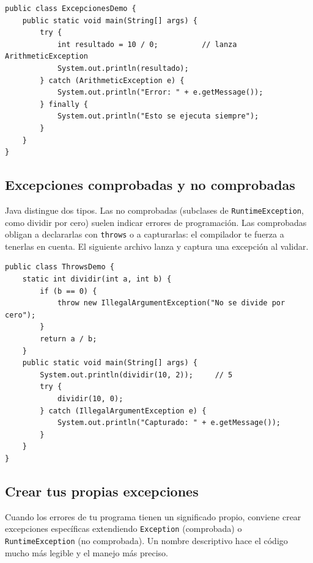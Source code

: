 \documentclass[11pt]{article}
\begin{document}
\begin{cajacodigo}
\begin{lstlisting}[style=java]
public class ExcepcionesDemo {
    public static void main(String[] args) {
        try {
            int resultado = 10 / 0;          // lanza ArithmeticException
            System.out.println(resultado);
        } catch (ArithmeticException e) {
            System.out.println("Error: " + e.getMessage());
        } finally {
            System.out.println("Esto se ejecuta siempre");
        }
    }
}
\end{lstlisting}
\end{cajacodigo}
\vspace{2pt}
\subsection{Excepciones comprobadas y no comprobadas}
Java distingue dos tipos. Las no comprobadas (subclases de \texttt{Runtime\allowbreak{}Exception}, como dividir por cero) suelen indicar errores de programación. Las comprobadas obligan a declararlas con \texttt{throws} o a capturarlas: el compilador te fuerza a tenerlas en cuenta. El siguiente archivo lanza y captura una excepción al validar.

\begin{cajacodigo}
\begin{lstlisting}[style=java]
public class ThrowsDemo {
    static int dividir(int a, int b) {
        if (b == 0) {
            throw new IllegalArgumentException("No se divide por cero");
        }
        return a / b;
    }
    public static void main(String[] args) {
        System.out.println(dividir(10, 2));     // 5
        try {
            dividir(10, 0);
        } catch (IllegalArgumentException e) {
            System.out.println("Capturado: " + e.getMessage());
        }
    }
}
\end{lstlisting}
\end{cajacodigo}
\vspace{2pt}
\subsection{Crear tus propias excepciones}
Cuando los errores de tu programa tienen un significado propio, conviene crear excepciones específicas extendiendo \texttt{Exception} (comprobada) o \texttt{Runtime\allowbreak{}Exception} (no comprobada). Un nombre descriptivo hace el código mucho más legible y el manejo más preciso.
\end{document}

